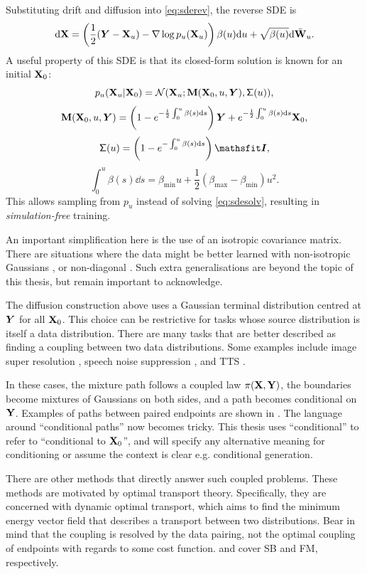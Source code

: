 Substituting drift and diffusion into \eqref{eq:sderev}, the reverse \ac{SDE} is
\[
\mathrm{d} {\mathbf{X}} = \left(\frac{1}{2}({\bm{Y}} - {\mathbf{X}}_u) - \nabla\log p_u({\mathbf{X}}_u)\right)\beta(u) \mathrm{d} u + \sqrt{\beta(u)} \mathrm{d}\bar{{\mathbf{W}}}_u.
\]
A useful property of this \ac{SDE} is that its closed-form solution is known for an initial ${\mathbf{X}}_0$:
\[
p_u({\mathbf{X}}_u|{\mathbf{X}}_0) = \mathcal N({\mathbf{X}}_u;{\mathbf{M}}({\mathbf{X}}_0,u,{\bm{Y}}),\mathsf\Sigma(u)),
\]
\[
{\mathbf{M}}({\mathbf{X}}_0,u,{\bm{Y}}) = \left(1-e^{-\frac{1}{2}\int_0^u\beta(s)\mathrm{d} s}\right){\bm{Y}} +e^{-\frac{1}{2}\int_0^u\beta(s)\mathrm{d} s}{\mathbf{X}}_0,
\]
\[
\mathsf\Sigma(u) = \left(1-e^{-\int_0^u\beta(s)\dd s}\right)\tI,
\]
\[
\int_0^u\beta(s)\dd s = \beta_{\min}u + \frac{1}{2}(\beta_{\max}-\beta_{\min})u^2.
\]
This allows sampling from $p_u$ instead of solving \eqref{eq:sdesolv}, resulting in \textit{simulation-free} training.

An important simplification here is the use of an isotropic covariance matrix. There are situations where the data might be better learned with non-isotropic Gaussians \citep{dhariwalDiffusionModelsBeat2021}, or non-diagonal \citep{xia2026improved,voleti2022scorebaseddenoisingdiffusionnonisotropic}. Such extra generalisations are beyond the topic of this thesis, but remain important to acknowledge.


The diffusion construction above uses a Gaussian terminal distribution centred at ${\bm{Y}}$ for all ${\mathbf{X}}_0$. This choice can be restrictive for tasks whose source distribution is itself a data distribution. There are many tasks that are better described as finding a coupling between two data distributions. Some examples include image super resolution \citep{moser2025diffsuperres}, speech noise suppression \cite{jukic2024schr,richterInvestigatingTrainingObjectives2025}, and \ac{TTS} \citep{popov21gradtts}.


In these cases, the mixture path follows a coupled law $\pi({\mathbf{X}},{\mathbf{Y}})$, the boundaries become mixtures of Gaussians on both sides, and a path becomes conditional on ${\mathbf{Y}}$. Examples of paths between paired endpoints are shown in . The language around ``conditional paths'' now becomes tricky. This thesis uses ``conditional'' to refer to ``conditional to ${\mathbf{X}}_0$'', and will specify any alternative meaning for conditioning or assume the context is clear e.g. conditional generation.

There are other methods that directly answer such coupled problems. These methods are motivated by optimal transport theory. Specifically, they are concerned with dynamic optimal transport, which aims to find the minimum energy vector field that describes a transport between two distributions. Bear in mind that the coupling is resolved by the data pairing, not the optimal coupling of endpoints with regards to some cost function.  and  cover \ac{SB} and \ac{FM}, respectively.

